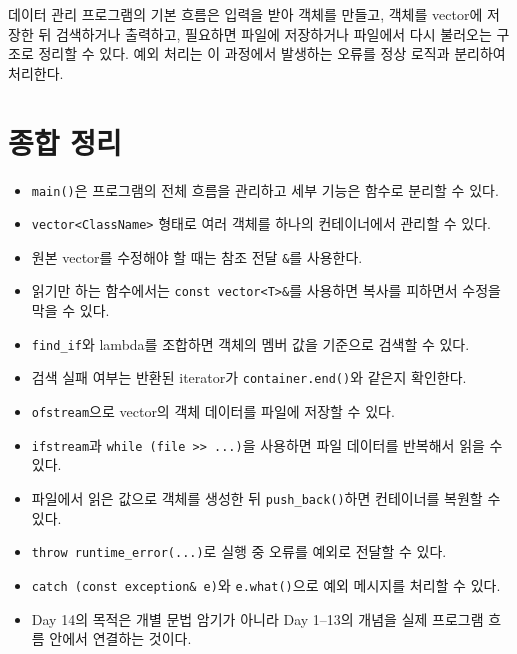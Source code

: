\documentclass[11pt,a4paper]{article}
\begin{document}
\begin{importantbox}
데이터 관리 프로그램의 기본 흐름은 입력을 받아 객체를 만들고,
객체를 vector에 저장한 뒤 검색하거나 출력하고,
필요하면 파일에 저장하거나 파일에서 다시 불러오는 구조로 정리할 수 있다.
예외 처리는 이 과정에서 발생하는 오류를 정상 로직과 분리하여 처리한다.
\end{importantbox}

\section{종합 정리}
\begin{importantbox}
\begin{itemize}[leftmargin=1.5em]
    \item \texttt{main()}은 프로그램의 전체 흐름을 관리하고 세부 기능은 함수로 분리할 수 있다.
    \item \texttt{vector<ClassName>} 형태로 여러 객체를 하나의 컨테이너에서 관리할 수 있다.
    \item 원본 vector를 수정해야 할 때는 참조 전달 \texttt{\&}를 사용한다.
    \item 읽기만 하는 함수에서는 \texttt{const vector<T>\&}를 사용하면 복사를 피하면서 수정을 막을 수 있다.
    \item \texttt{find\_if}와 lambda를 조합하면 객체의 멤버 값을 기준으로 검색할 수 있다.
    \item 검색 실패 여부는 반환된 iterator가 \texttt{container.end()}와 같은지 확인한다.
    \item \texttt{ofstream}으로 vector의 객체 데이터를 파일에 저장할 수 있다.
    \item \texttt{ifstream}과 \texttt{while (file >> ...)}을 사용하면 파일 데이터를 반복해서 읽을 수 있다.
    \item 파일에서 읽은 값으로 객체를 생성한 뒤 \texttt{push\_back()}하면 컨테이너를 복원할 수 있다.
    \item \texttt{throw runtime\_error(...)}로 실행 중 오류를 예외로 전달할 수 있다.
    \item \texttt{catch (const exception\& e)}와 \texttt{e.what()}으로 예외 메시지를 처리할 수 있다.
    \item Day 14의 목적은 개별 문법 암기가 아니라 Day 1--13의 개념을 실제 프로그램 흐름 안에서 연결하는 것이다.
\end{itemize}
\end{importantbox}
\end{document}
